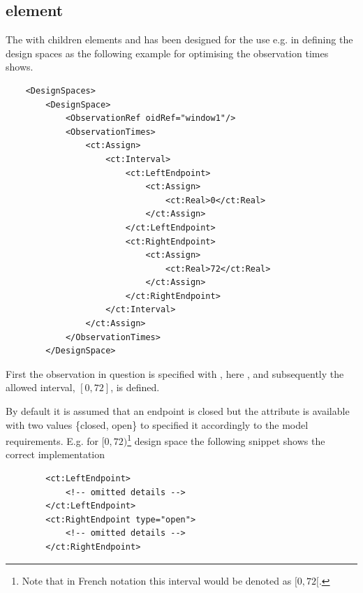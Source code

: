 \subsection{ element}
The  with children elements  and 
has been designed for the use e.g. in defining the design spaces as the 
following example for optimising the observation times shows. 
\lstset{language=XML}
\begin{lstlisting}
    <DesignSpaces>
        <DesignSpace>
            <ObservationRef oidRef="window1"/>
            <ObservationTimes>
                <ct:Assign>
                    <ct:Interval>
                        <ct:LeftEndpoint>
                            <ct:Assign>
                                <ct:Real>0</ct:Real>
                            </ct:Assign>
                        </ct:LeftEndpoint>
                        <ct:RightEndpoint>
                            <ct:Assign>
                                <ct:Real>72</ct:Real>
                            </ct:Assign>
                        </ct:RightEndpoint>
                    </ct:Interval>
                </ct:Assign>
            </ObservationTimes>
        </DesignSpace>
\end{lstlisting}
First the observation in question is specified with , 
here , and subsequently the allowed interval, $[0,72]$, is defined.

By default it is assumed that an endpoint is closed but the attribute 
is available with two values \{closed, open\} to specified it accordingly to the 
model requirements. E.g. for $[0,72)$\footnote{Note that in French notation this interval
would be denoted as $[0,72[$.} design space the following snippet shows the 
correct implementation
\lstset{language=XML}
\begin{lstlisting}
        <ct:LeftEndpoint>
            <!-- omitted details -->
        </ct:LeftEndpoint>
        <ct:RightEndpoint type="open">
            <!-- omitted details -->
        </ct:RightEndpoint>
\end{lstlisting}



